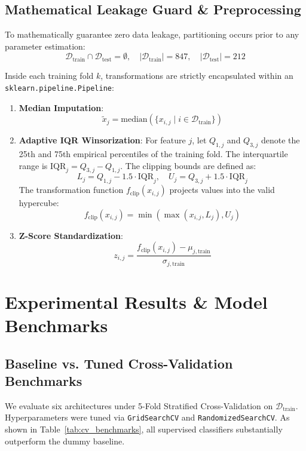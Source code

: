 \documentclass[conference]{IEEEtran}
\begin{document}
\subsection{Mathematical Leakage Guard \& Preprocessing}
To mathematically guarantee zero data leakage, partitioning occurs prior to any parameter estimation:
\begin{equation}
\mathcal{D}_{\text{train}} \cap \mathcal{D}_{\text{test}} = \emptyset, \quad |\mathcal{D}_{\text{train}}| = 847, \quad |\mathcal{D}_{\text{test}}| = 212
\end{equation}

Inside each training fold $k$, transformations are strictly encapsulated within an \texttt{sklearn.pipeline.Pipeline}:
\begin{enumerate}
    \item \textbf{Median Imputation}:
    \begin{equation}
    \tilde{x}_j = \text{median}(\{x_{i,j} \mid i \in \mathcal{D}_{\text{train}}\})
    \end{equation}
    \item \textbf{Adaptive IQR Winsorization}:
    For feature $j$, let $Q_{1,j}$ and $Q_{3,j}$ denote the 25th and 75th empirical percentiles of the training fold. The interquartile range is $\text{IQR}_j = Q_{3,j} - Q_{1,j}$. The clipping bounds are defined as:
    \begin{equation}
    L_j = Q_{1,j} - 1.5 \cdot \text{IQR}_j, \quad U_j = Q_{3,j} + 1.5 \cdot \text{IQR}_j
    \end{equation}
    The transformation function $f_{\text{clip}}(x_{i,j})$ projects values into the valid hypercube:
    \begin{equation}
    f_{\text{clip}}(x_{i,j}) = \min(\max(x_{i,j}, L_j), U_j)
    \end{equation}
    \item \textbf{Z-Score Standardization}:
    \begin{equation}
    z_{i,j} = \frac{f_{\text{clip}}(x_{i,j}) - \mu_{j,\text{train}}}{\sigma_{j,\text{train}}}
    \end{equation}
\end{enumerate}

\section{Experimental Results \& Model Benchmarks}

\subsection{Baseline vs. Tuned Cross-Validation Benchmarks}
We evaluate six architectures under 5-Fold Stratified Cross-Validation on $\mathcal{D}_{\text{train}}$. Hyperparameters were tuned via \texttt{GridSearchCV} and \texttt{RandomizedSearchCV}. As shown in Table~\ref{tab:cv_benchmarks}, all supervised classifiers substantially outperform the dummy baseline.
\end{document}
